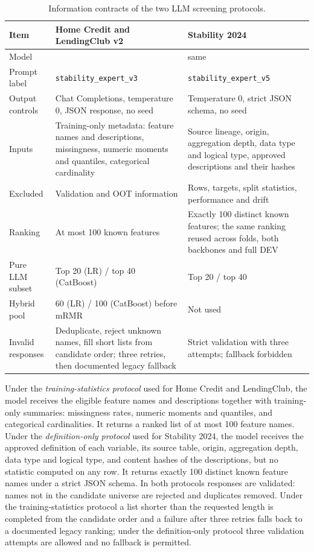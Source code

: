\documentclass[preprint,12pt]{elsarticle}
\begin{document}
\begin{table}[htbp]
\centering
\footnotesize
\begin{threeparttable}
\caption{Information contracts of the two LLM screening protocols.}
\label{tab:llm_contracts}
\begin{tabular}{@{}L{24mm}L{51mm}L{51mm}@{}}
\toprule
Item & Home Credit and LendingClub v2 & Stability 2024 \\
\midrule
Model &  & same \\
Prompt label & \texttt{stability\_expert\_v3} & \texttt{stability\_expert\_v5} \\
Output controls & Chat Completions, temperature 0, JSON response, no seed & Temperature 0, strict JSON schema, no seed \\
Inputs & Training-only metadata: feature names and descriptions, missingness, numeric moments and quantiles, categorical cardinality & Source lineage, origin, aggregation depth, data type and logical type, approved descriptions and their hashes \\
Excluded & Validation and OOT information & Rows, targets, split statistics, performance and drift \\
Ranking & At most 100 known features & Exactly 100 distinct known features; the same ranking reused across folds, both backbones and full DEV \\
Pure LLM subset & Top 20 (LR) / top 40 (CatBoost) & Top 20 / top 40 \\
Hybrid pool & 60 (LR) / 100 (CatBoost) before mRMR & Not used \\
Invalid responses & Deduplicate, reject unknown names, fill short lists from candidate order; three retries, then documented legacy fallback & Strict validation with three attempts; fallback forbidden \\
\bottomrule
\end{tabular}
\end{threeparttable}
\end{table}

Under the \emph{training-statistics protocol} used for Home Credit and LendingClub, the model receives the eligible feature names and descriptions together with training-only summaries: missingness rates, numeric moments and quantiles, and categorical cardinalities. It returns a ranked list of at most 100 feature names. Under the \emph{definition-only protocol} used for Stability 2024, the model receives the approved definition of each variable, its source table, origin, aggregation depth, data type and logical type, and content hashes of the descriptions, but no statistic computed on any row. It returns exactly 100 distinct known feature names under a strict JSON schema. In both protocols responses are validated: names not in the candidate universe are rejected and duplicates removed. Under the training-statistics protocol a list shorter than the requested length is completed from the candidate order and a failure after three retries falls back to a documented legacy ranking; under the definition-only protocol three validation attempts are allowed and no fallback is permitted.
\end{document}
